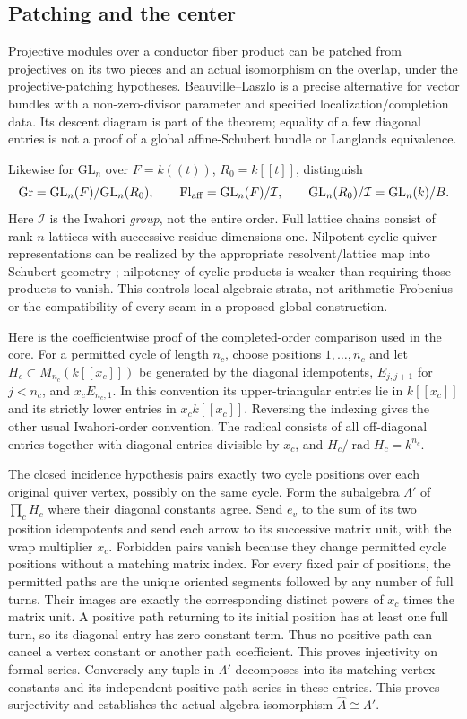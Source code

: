 \subsection{Patching and the center}
Projective modules over a conductor fiber product can be patched from projectives on its two pieces and an actual isomorphism on the overlap, under the projective-patching hypotheses. Beauville--Laszlo \cite{BL} is a precise alternative for vector bundles with a non-zero-divisor parameter and specified localization/completion data. Its descent diagram is part of the theorem; equality of a few diagonal entries is not a proof of a global affine-Schubert bundle or Langlands equivalence.

Likewise for $\mathrm{GL}_n$ over $F=k((t))$, $R_0=k[[t]]$, distinguish
\[
 \mathrm{Gr}=\mathrm{GL}_n(F)/\mathrm{GL}_n(R_0),\qquad
 \mathrm{Fl}_{\rm aff}=\mathrm{GL}_n(F)/\mathcal I,
 \qquad \mathrm{GL}_n(R_0)/\mathcal I=\mathrm{GL}_n(k)/B.
\]
Here $\mathcal I$ is the Iwahori \emph{group}, not the entire order. Full lattice chains consist of rank-$n$ lattices with successive residue dimensions one. Nilpotent cyclic-quiver representations can be realized by the appropriate resolvent/lattice map into Schubert geometry \cite{Magyar}; nilpotency of cyclic products is weaker than requiring those products to vanish. This controls local algebraic strata, not arithmetic Frobenius or the compatibility of every seam in a proposed global construction.

Here is the coefficientwise proof of the completed-order comparison used in the core. For a permitted cycle of length $n_c$, choose positions $1,\ldots,n_c$ and let $H_c\subset M_{n_c}(k[[x_c]])$ be generated by the diagonal idempotents, $E_{j,j+1}$ for $j<n_c$, and $x_cE_{n_c,1}$. In this convention its upper-triangular entries lie in $k[[x_c]]$ and its strictly lower entries in $x_ck[[x_c]]$. Reversing the indexing gives the other usual Iwahori-order convention. The radical consists of all off-diagonal entries together with diagonal entries divisible by $x_c$, and $H_c/\operatorname{rad}H_c=k^{n_c}$.

The closed incidence hypothesis pairs exactly two cycle positions over each original quiver vertex, possibly on the same cycle. Form the subalgebra $\Lambda'$ of $\prod_cH_c$ where their diagonal constants agree. Send $e_v$ to the sum of its two position idempotents and send each arrow to its successive matrix unit, with the wrap multiplier $x_c$. Forbidden pairs vanish because they change permitted cycle positions without a matching matrix index. For every fixed pair of positions, the permitted paths are the unique oriented segments followed by any number of full turns. Their images are exactly the corresponding distinct powers of $x_c$ times the matrix unit. A positive path returning to its initial position has at least one full turn, so its diagonal entry has zero constant term. Thus no positive path can cancel a vertex constant or another path coefficient. This proves injectivity on formal series. Conversely any tuple in $\Lambda'$ decomposes into its matching vertex constants and its independent positive path series in these entries. This proves surjectivity and establishes the actual algebra isomorphism $\widehat A\cong\Lambda'$.

